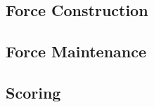 

\subsection{Force Construction}
\label{subsec:event_force_construction}



\subsection{Force Maintenance}
\label{subsec:event_force_maintenance}



\subsection{Scoring}


